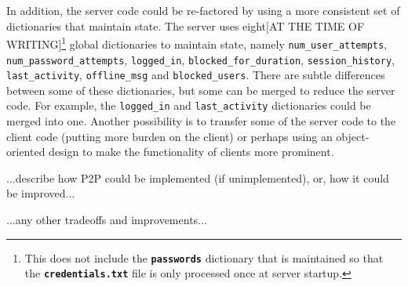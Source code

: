 \documentclass[12pt,a4paper]{article}
\begin{document}
In addition, the server code could be re-factored by using a more consistent set of dictionaries that maintain state. The server uses eight[AT THE TIME OF WRITING]\footnote{This does not include the \textbf{\tt{passwords}} dictionary that is maintained so that the \textbf{\tt{credentials.txt}} file is only processed once at server startup.} global dictionaries to maintain state, namely \verb|num_user_attempts|, \verb|num_password_attempts|, \verb|logged_in|, \verb|blocked_for_duration|, \verb|session_history|, \verb|last_activity|, \verb|offline_msg| and \verb|blocked_users|. There are subtle differences between some of these dictionaries, but some can be merged to reduce the server code. For example, the \verb|logged_in| and \verb|last_activity| dictionaries could be merged into one. Another possibility is to transfer some of the server code to the client code (putting more burden on the client) or perhaps using an object-oriented design to make the functionality of clients more prominent.

...describe how P2P could be implemented (if unimplemented), or, how it could be improved...

...any other tradeoffs and improvements...
\end{document}
